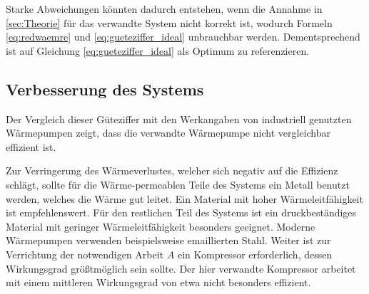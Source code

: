 Starke Abweichungen könnten dadurch entstehen, wenn die Annahme in \ref{sec:Theorie} für das verwandte System nicht korrekt ist, wodurch Formeln \eqref{eq:redwaemre} und \eqref{eq:gueteziffer_ideal} unbrauchbar werden. 
Dementsprechend ist auf Gleichung \eqref{eq:gueteziffer_ideal} als Optimum zu referenzieren.

\subsection{Verbesserung des Systems}
Der Vergleich dieser Güteziffer mit den Werkangaben von industriell genutzten Wärmepumpen zeigt, dass die verwandte Wärmepumpe nicht vergleichbar effizient ist.

Zur Verringerung des Wärmeverlustes, welcher sich negativ auf die Effizienz schlägt, sollte für die Wärme-permeablen Teile des Systems ein Metall benutzt werden, welches die Wärme gut leitet.
Ein Material mit hoher Wärmeleitfähigkeit ist empfehlenswert.
Für den restlichen Teil des Systems ist ein druckbeständiges Material mit geringer Wärmeleitfähigkeit besonders geeignet.
Moderne Wärmepumpen verwenden beispielsweise emaillierten Stahl\cite{viessmann_VITOCAL161A}.
Weiter ist zur Verrichtung der notwendigen Arbeit $A$ ein Kompressor erforderlich, dessen Wirkungsgrad größtmöglich sein sollte.
Der hier verwandte Kompressor arbeitet mit einem mittleren Wirkungsgrad von etwa %
nicht besonders effizient.
